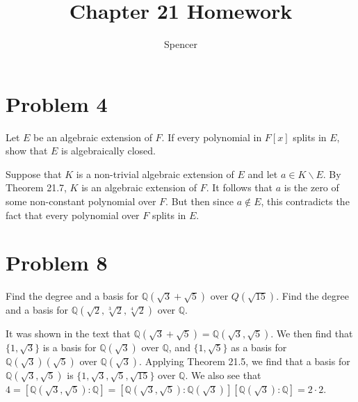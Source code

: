 \documentclass{article}
\title{Chapter 21 Homework}
\author{Spencer}
\begin{document}
\maketitle

\newcommand{\Z}{\mathbb{Z}}
\newcommand{\R}{\mathbb{R}}
\newcommand{\N}{\mathbb{N}}
\newcommand{\Q}{\mathbb{Q}}

\section*{Problem 4}

Let $E$ be an algebraic extension of $F$.  If every polynomial in $F[x]$
splits in $E$, show that $E$ is algebraically closed.

Suppose that $K$ is a non-trivial algebraic extension of $E$ and
let $a\in K\backslash E$.  By Theorem 21.7, $K$ is an algebraic extension
of $F$.  It follows that $a$ is the zero of some non-constant polynomial
over $F$.  But then since $a\not\in E$, this contradicts the fact that
every polynomial over $F$ splits in $E$.

\section*{Problem 8}

Find the degree and a basis for $\Q(\sqrt{3}+\sqrt{5})$ over $Q(\sqrt{15})$.
Find the degree and a basis for $\Q(\sqrt{2},\sqrt[3]{2},\sqrt[4]{2})$ over $\Q$.

It was shown in the text that $\Q(\sqrt{3}+\sqrt{5})=\Q(\sqrt{3},\sqrt{5})$.
We then find that $\{1,\sqrt{3}\}$ is a basis for $\Q(\sqrt{3})$ over $\Q$, and
$\{1,\sqrt{5}\}$ as a basis for $\Q(\sqrt{3})(\sqrt{5})$ over $\Q(\sqrt{3})$.
Applying Theorem 21.5, we find that a basis for $\Q(\sqrt{3},\sqrt{5})$
is $\{1,\sqrt{3},\sqrt{5},\sqrt{15}\}$ over $\Q$.  We also see that
$4=[\Q(\sqrt{3},\sqrt{5}):\Q]=[\Q(\sqrt{3},\sqrt{5}):\Q(\sqrt{3})][\Q(\sqrt{3}):\Q]=2\cdot 2$.
\end{document}
